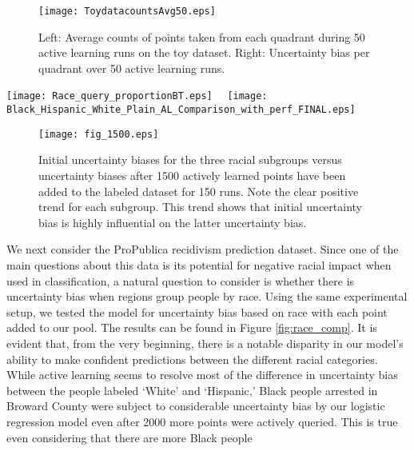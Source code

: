 \begin{figure}[h]
\centering
\texttt{[image: ToydatacountsAvg50.eps]}~~
\caption{Left: Average counts of points taken from each quadrant during 50 active learning runs on the toy dataset. Right: Uncertainty bias per quadrant over 50 active learning runs.}
\label{fig:toy_illustrate}
\end{figure}


\begin{figure*}[h]
\begin{center}
\texttt{[image: Race\_query\_proportionBT.eps]}~~
\texttt{[image: Black\_Hispanic\_White\_Plain\_AL\_Comparison\_with\_perf\_FINAL.eps]}
\caption{Left: The proportion of the three subpopulations conditioned on race that were either in the initial set or have since been queried by the active learning algorithm for the ProPublica dataset experiment. Right: The corresponding uncertainty bias for each subpopulation conditioned on race as active learning queries are made.}
\label{fig:race_comp}
\end{center}
\end{figure*}


\begin{figure}[h]
\begin{center}
\texttt{[image: fig\_1500.eps]}
\caption{Initial uncertainty biases for the three racial subgroups versus uncertainty biases after 1500 actively learned points have been added to the labeled dataset for 150 runs. Note the clear positive trend for each subgroup. This trend shows that initial uncertainty bias is highly influential on the latter uncertainty bias.}
\label{fig:race_bias_corr}
\end{center}
\end{figure}

We next consider the ProPublica recidivism prediction dataset.  Since one of the main questions about this data is its potential for negative racial impact when used in classification, a natural question to consider is whether there is uncertainty bias when regions group people by race.  Using the same experimental setup, we tested the model for uncertainty bias based on race with each point added to our pool. The results can be found in Figure \ref{fig:race_comp}. It is evident that, from the very beginning, there is a notable disparity in our model's ability to make confident predictions between the different racial categories. While active learning seems to resolve most of the difference in uncertainty bias between the people labeled `White' and `Hispanic,' Black people arrested in Broward County were subject to considerable uncertainty bias by our logistic regression model even after 2000 more points were actively queried. This is true even considering that there are more Black people 


